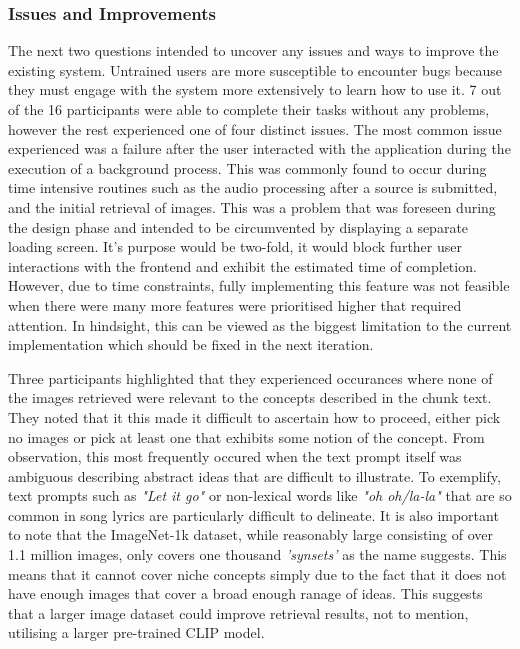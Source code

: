 \documentclass{l4proj}
\begin{document}
\subsubsection{Issues and Improvements}
The next two questions intended to uncover any issues and ways to improve the existing system. Untrained users are more susceptible to encounter bugs because they must engage with the system more extensively to learn how to use it. 7 out of the 16 participants were able to complete their tasks without any problems, however the rest experienced one of four distinct issues. The most common issue experienced was a failure after the user interacted with the application during the execution of a background process. This was commonly found to occur during time intensive routines such as the audio processing after a source is submitted, and the initial retrieval of images. This was a problem that was foreseen during the design phase and intended to be circumvented by displaying a separate loading screen. It's purpose would be two-fold, it would block further user interactions with the frontend and exhibit the estimated time of completion. However, due to time constraints, fully implementing this feature was not feasible when there were many more features were prioritised higher that required attention. In hindsight, this can be viewed as the biggest limitation to the current implementation which should be fixed in the next iteration.

Three participants highlighted that they experienced occurances where none of the images retrieved were relevant to the concepts described in the chunk text. They noted that it this made it difficult to ascertain how to proceed, either pick no images or pick at least one that exhibits some notion of the concept. From observation, this most frequently occured when the text prompt itself was ambiguous describing abstract ideas that are difficult to illustrate.
To exemplify, text prompts such as \emph{"Let it go"} or non-lexical words like \emph{"oh oh/la-la"} that are so common in song lyrics are particularly difficult to delineate. It is also important to note that the ImageNet-1k dataset, while reasonably large consisting of over 1.1 million images, only covers one thousand \emph{'synsets'} as the name suggests. This means that it cannot cover niche concepts simply due to the fact that it does not have enough images that cover a broad enough ranage of ideas. This suggests that a larger image dataset could improve retrieval results, not to mention, utilising a larger pre-trained CLIP model.
\end{document}
